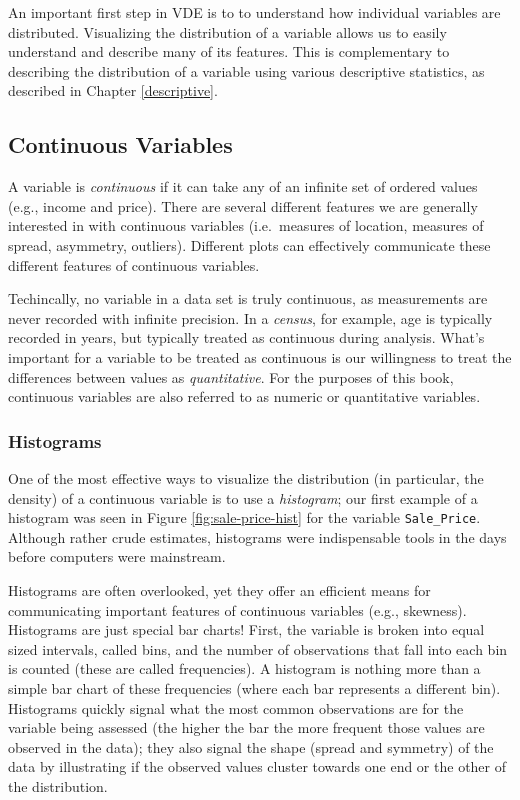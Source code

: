 \documentclass[]{book}
\theoremstyle{definition}
\theoremstyle{definition}
\theoremstyle{definition}
\theoremstyle{remark}
\let\BeginKnitrBlock\begin \let\EndKnitrBlock\end
\begin{document}
An important first step in VDE is to to understand how individual
variables are distributed. Visualizing the distribution of a variable
allows us to easily understand and describe many of its features. This
is complementary to describing the distribution of a variable using
various descriptive statistics, as described in Chapter
\ref{descriptive}.

\hypertarget{continuous-variables}{%
\subsection{Continuous Variables}\label{continuous-variables}}

A variable is \emph{continuous} if it can take any of an infinite set of
ordered values (e.g., income and price). There are several different
features we are generally interested in with continuous variables
(i.e.~measures of location, measures of spread, asymmetry, outliers).
Different plots can effectively communicate these different features of
continuous variables.

\BeginKnitrBlock{note}
Techincally, no variable in a data set is truly continuous, as
measurements are never recorded with infinite precision. In a
\emph{census}, for example, age is typically recorded in years, but
typically treated as continuous during analysis. What's important for a
variable to be treated as continuous is our willingness to treat the
differences between values as \emph{quantitative}. For the purposes of
this book, continuous variables are also referred to as numeric or
quantitative variables.
\EndKnitrBlock{note}

\hypertarget{histograms}{%
\subsubsection{Histograms}\label{histograms}}

One of the most effective ways to visualize the distribution (in
particular, the density) of a continuous variable is to use a
\emph{histogram}; our first example of a histogram was seen in Figure
\ref{fig:sale-price-hist} for the variable \texttt{Sale\_Price}.
Although rather crude estimates, histograms were indispensable tools in
the days before computers were mainstream.

Histograms are often overlooked, yet they offer an efficient means for
communicating important features of continuous variables (e.g.,
skewness). Histograms are just special bar charts! First, the variable
is broken into equal sized intervals, called bins, and the number of
observations that fall into each bin is counted (these are called
frequencies). A histogram is nothing more than a simple bar chart of
these frequencies (where each bar represents a different bin).
Histograms quickly signal what the most common observations are for the
variable being assessed (the higher the bar the more frequent those
values are observed in the data); they also signal the shape (spread and
symmetry) of the data by illustrating if the observed values cluster
towards one end or the other of the distribution.
\end{document}
